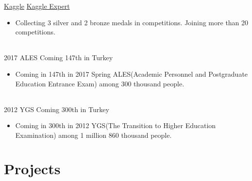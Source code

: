 \documentclass[letterpaper]{DS_class_file} %
\begin{document}
\begin{twenty} %
	\twentyitem
	{\href{https://www.kaggle.com}{Kaggle}}
	{}
	{\hspace{0.3cm}\href{https://www.kaggle.com/mbkinaci}{Kaggle Expert}}
	{}
	{}
	{
		{\begin{itemize}
				\item Collecting 3 silver and 2 bronze medals in competitions. Joining more than 20 competitions.
		\end{itemize}}
	}
	\\
	\twentyitem
	{2017 ALES}
	{}
	{\hspace{0.3cm}Coming 147th in Turkey}
	{}
	{}
	{
		{\begin{itemize}
				\item Coming in 147th in 2017 Spring ALES(Academic Personnel and Postgraduate Education Entrance Exam) among 300 thousand people.
		\end{itemize}}
	}
	\\
	\twentyitem
	{2012 YGS}
	{}
	{\hspace{0.3cm}Coming 300th in Turkey}
	{}
	{}
	{\begin{itemize}
			\item Coming in 300th in 2012 YGS(The Transition to Higher Education \newline Examination) among 1 million 860 thousand people.       
	\end{itemize}}

\end{twenty}

\newpage

\makeseconda %

\section{Projects}
\end{document}
